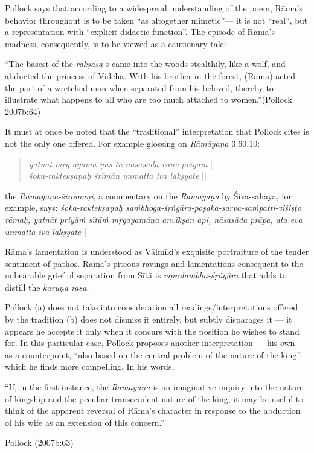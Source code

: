 Pollock says that according to a widespread understanding of the poem, Rāma’s behavior throughout is to be taken “as altogether mimetic”--- it is not “real”, but a representation with “explicit didactic function”. The episode of Rāma’s madness, consequently, is to be viewed as a cautionary tale: 

\newpage

\begin{myquote}
“The basest of the {\sl rākṣasa}-s came into the woods stealthily, like a wolf, and abducted the princess of Videha. With his brother in the forest, (Rāma) acted the part of a wretched man when separated from his beloved, thereby to illustrate what happens to all who are too much attached to women.”\hfill (Pollock 2007b:64)
\end{myquote}

It must at once be noted that the “traditional” interpretation that Pollock cites is not the only one offered. For example glossing on {\sl Rāmāyaṇa} 3.60.10:\\[-20pt] 
\begin{quote}
{{\sl yatnāt mṛg ayamā ṇas tu nāsasāda vane priyām}} |\\
{\sl śoka-raktekṣaṇaḥ śrīmān unmatta iva lakṣyate} ||\\[-20pt]  
\end{quote}
the {\sl Rāmāyaṇa-śiromaṇi}, a commentary on the {\sl Rāmāyaṇa} by Śiva-sahāya, for example, says: {\sl śoka-raktekṣaṇaḥ saṁbhoga-śṛṅgāra-poṣaka-sarva-saṁpatti-viśiṣṭo rāmaḥ, yatnāt priyāṁ sītāṁ mṛgaya\-māṇa anvīkṣan api, nāsasāda prāpa, ata eva unmatta iva lakṣyate} |  

Rāma’s lamentation is understood as Vālmīki’s exquisite portraiture of the tender sentiment of pathos. Rāma’s piteous ravings and lamentations consequent to the unbearable grief of separation from Sītā is {\sl vipralambha-śṛṅgāra} that adds to distill the {\sl karuṇa rasa}. 

Pollock (a) does not take into consideration all readings/interpretations offered by the tradition (b) does not dismiss it entirely, but subtly disparages it --- it appears he accepts it only when it concurs with the position he wishes to stand for. In this particular case, Pollock proposes another interpretation --- his own --- as a counterpoint, “also based on the central problem of the nature of the king” which he finds more compelling. In his words, 

\begin{myquote}
“If, in the first instance, the {\sl Rāmāyaṇa} is an imaginative inquiry into the nature of kingship and the peculiar transcendent nature of the king, it may be useful to think of the apparent reversal of Rāma’s character in response to the abduction of his wife as an extension of this concern.”

\hfill Pollock (2007b:63)
\end{myquote}

